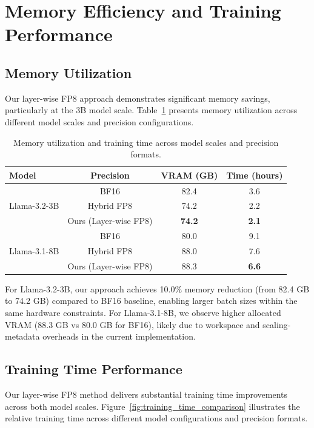 \section{Memory Efficiency and Training Performance}\label{sec:time_reduction}

\subsection{Memory Utilization}
Our layer-wise FP8 approach demonstrates significant memory savings, particularly at the 3B model scale. Table~\ref{tab:memory_results} presents memory utilization across different model scales and precision configurations.

\begin{table}[h]
\centering
\begin{tabular}{lccc}
\toprule
\textbf{Model} & \textbf{Precision} & \textbf{VRAM (GB)} & \textbf{Time (hours)} \\
\midrule
\multirow{3}{*}{Llama-3.2-3B} & BF16 & 82.4 & 3.6 \\
 & Hybrid FP8 & 74.2 & 2.2 \\
 & Ours (Layer-wise FP8) & \textbf{74.2} & \textbf{2.1} \\
\midrule
\multirow{3}{*}{Llama-3.1-8B} & BF16 & 80.0 & 9.1 \\
 & Hybrid FP8 & 88.0 & 7.6 \\
 & Ours (Layer-wise FP8) & 88.3 & \textbf{6.6} \\
\bottomrule
\end{tabular}
\caption{Memory utilization and training time across model scales and precision formats.}
\label{tab:memory_results}
\end{table}

For Llama-3.2-3B, our approach achieves 10.0\% memory reduction (from 82.4 GB to 74.2 GB) compared to BF16 baseline, enabling larger batch sizes within the same hardware constraints. For Llama-3.1-8B, we observe higher allocated VRAM (88.3 GB vs 80.0 GB for BF16), likely due to workspace and scaling-metadata overheads in the current implementation.

\subsection{Training Time Performance}
Our layer-wise FP8 method delivers substantial training time improvements across both model scales. Figure~\ref{fig:training_time_comparison} illustrates the relative training time across different model configurations and precision formats.

